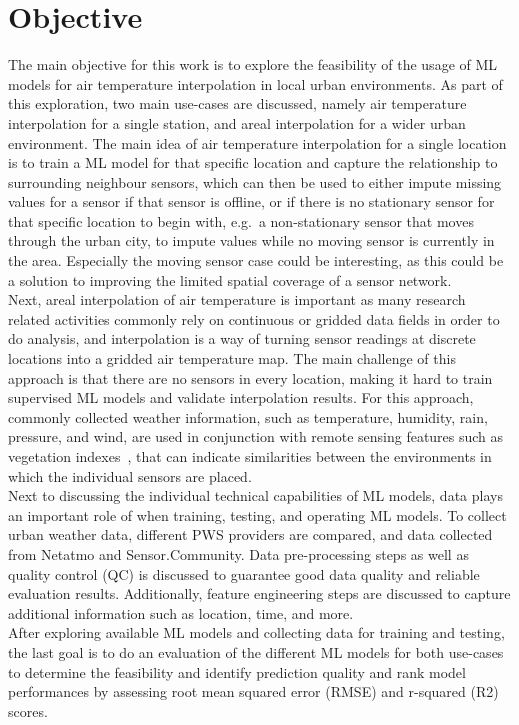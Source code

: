 \section{Objective}

The main objective for this work is to explore the feasibility of the usage of ML models for air temperature interpolation in local urban environments. As part of this exploration, two main use-cases are discussed, namely air temperature interpolation for a single station, and areal interpolation for a wider urban environment. The main idea of air temperature interpolation for a single location is to train a ML model for that specific location and capture the relationship to surrounding neighbour sensors, which can then be used to either impute missing values for a sensor if that sensor is offline, or if there is no stationary sensor for that specific location to begin with, e.g.\ a non-stationary sensor that moves through the urban city, to impute values while no moving sensor is currently in the area. Especially the moving sensor case could be interesting, as this could be a solution to improving the limited spatial coverage of a sensor network.\\
Next, areal interpolation of air temperature is important as many research related activities commonly rely on continuous or gridded data fields in order to do analysis, and interpolation is a way of turning sensor readings at discrete locations into a gridded air temperature map. The main challenge of this approach is that there are no sensors in every location, making it hard to train supervised ML models and validate interpolation results. For this approach, commonly collected weather information, such as temperature, humidity, rain, pressure, and wind, are used in conjunction with remote sensing features such as vegetation indexes~\cite{alonso2020new}, that can indicate similarities between the environments in which the individual sensors are placed.\\
Next to discussing the individual technical capabilities of ML models, data plays an important role of when training, testing, and operating ML models. To collect urban weather data, different PWS providers are compared, and data collected from Netatmo and Sensor.Community. Data pre-processing steps as well as quality control (QC) is discussed to guarantee good data quality and reliable evaluation results. Additionally, feature engineering steps are discussed to capture additional information such as location, time, and more.\\
After exploring available ML models and collecting data for training and testing, the last goal is to do an evaluation of the different ML models for both use-cases to determine the feasibility and identify prediction quality and rank model performances by assessing root mean squared error (RMSE) and r-squared (R2) scores.

